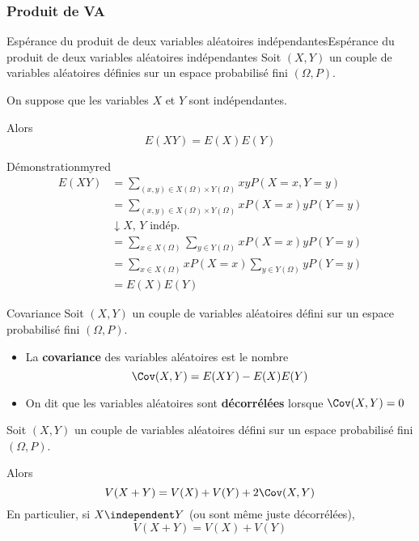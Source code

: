     \subsubsection{Produit de VA}

    \begin{theo}{Espérance du produit de deux variables aléatoires indépendantes}{Espérance du produit de deux variables aléatoires indépendantes}
        Soit $(X,Y)$ un couple de variables aléatoires définies sur un espace probabilisé fini $(\Omega,P)$.

        On suppose que les variables $X$ et $Y$ sont indépendantes.

        Alors \[ E(XY) = E(X)E(Y) \] 
    \end{theo}

    \begin{demo}{Démonstration}{myred}
        \begin{align*}
            E(XY) &= \sum\limits_{(x,y) \in X(\Omega)\times Y(\Omega)} xy P(X=x,Y=y)  \\
            &= \sum\limits_{(x,y) \in X(\Omega)\times Y(\Omega)} xP(X=x)yP(Y=y)  \\
            & \downarrow X, \, Y \text{ indép.} \\
            &= \sum\limits_{x \in X(\Omega)} \sum\limits_{y \in Y(\Omega)} xP(X=x)yP(Y=y)  \\
            &= \sum\limits_{x \in X(\Omega)} xP(X=x) \sum\limits_{y \in Y(\Omega)} yP(Y=y)  \\
            &= E(X) E(Y)
        \end{align*}
    \end{demo}

    \begin{defi}{Covariance}{}
        Soit $(X,Y)$ un couple de variables aléatoires défini sur un espace probabilisé fini $(\Omega,P)$. 
        \begin{itemize}
            \item La \textbf{covariance} des variables aléatoires est le nombre \[ \Cov(X,Y) = E(XY)-E(X)E(Y) \]
            \item On dit que les variables aléatoires sont \textbf{décorrélées} lorsque $\Cov(X,Y) = 0$
        \end{itemize}
    \end{defi}

    \begin{prop}{}{}
        Soit $(X,Y)$ un couple de variables aléatoires défini sur un espace probabilisé fini $(\Omega,P)$.

        Alors 
        \[ V(X+Y) = V(X) + V(Y) + 2\Cov(X,Y) \]
        En particulier, si $X \independent Y$ (ou sont même juste décorrélées), \[V(X+Y) = V(X) + V(Y) \]   
    \end{prop}

